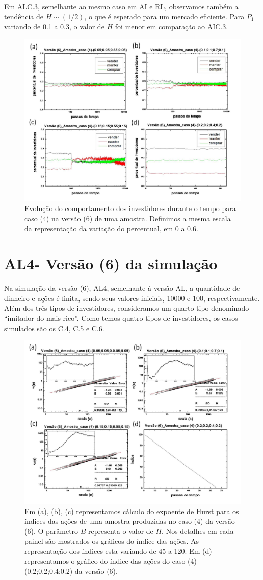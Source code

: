 \documentclass[brazil,ruledheader]{abnt}
\begin{document}
Em ALC.3, semelhante ao mesmo caso em AI e RL, observamos também a tendência de
$H\sim (1/2)$, o que é esperado para um
mercado eficiente. Para $P_1$ variando de 0.1 a 0.3, o valor de $H$ foi menor em
comparação ao AIC.3.

\begin{figure}[!h]
\centering
\includegraphics[width=.7\linewidth]{Figuras/37.jpg}
\caption{Evolução do comportamento dos investidores durante o tempo para caso
(4) na  versão (6) de uma amostra. Definimos a mesma escala da representação da
variação do percentual, em 0 a 0.6.  }
\label{fig:evolucao-comp-investidores10}
\end{figure}

\section{AL4- Versão (6) da simulação}

Na simulação da versão (6), AL4, semelhante à versão AL, a quantidade de
dinheiro e ações é finita, sendo seus valores iniciais, 10000 e 100,
respectivamente. Além dos três tipos de investidores, consideramos um quarto
tipo denominado ``imitador do mais rico''. Como temos quatro tipos de
investidores, os casos simulados são os C.4, C.5 e C.6.

\begin{figure}[!h]
\centering
\includegraphics[width=.7\linewidth]{Figuras/38.jpg}
\caption{Em (a), (b), (c) representamos cálculo do expoente de Hurst para os
índices das ações de uma amostra produzidas no caso (4) da versão (6).  O
parâmetro $B$ representa o valor de $H$. Nos detalhes em cada painel são
mostrados os gráficos do índice das ações. As representação dos índices esta
variando de 45 a 120.  Em (d) representamos o gráfico do índice das ações do
caso (4)(0.2;0.2;0.4;0.2) da versão (6). }
\label{fig:calculo-exp-hurst13}
\end{figure}
\end{document}
